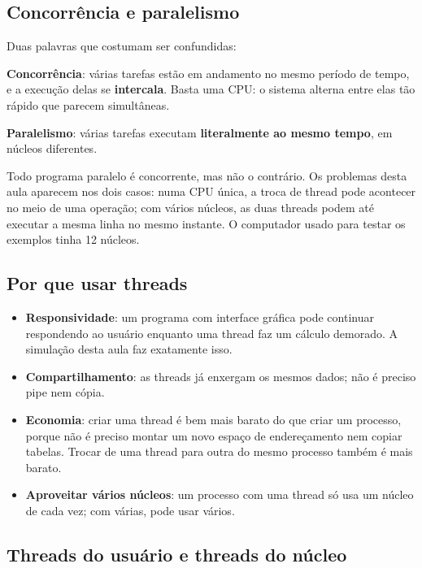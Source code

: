 \documentclass[11pt,a4paper]{article}
\begin{document}
\subsection{Concorrência e paralelismo}

Duas palavras que costumam ser confundidas:

\begin{definicao}
\textbf{Concorrência}: várias tarefas estão em andamento no mesmo período de tempo, e a execução delas se \textbf{intercala}. Basta uma CPU: o sistema alterna entre elas tão rápido que parecem simultâneas.

\textbf{Paralelismo}: várias tarefas executam \textbf{literalmente ao mesmo tempo}, em núcleos diferentes.
\end{definicao}

Todo programa paralelo é concorrente, mas não o contrário. Os problemas desta aula aparecem nos dois casos: numa CPU única, a troca de thread pode acontecer no meio de uma operação; com vários núcleos, as duas threads podem até executar a mesma linha no mesmo instante. O computador usado para testar os exemplos tinha 12 núcleos.

\subsection{Por que usar threads}

\begin{itemize}
    \item \textbf{Responsividade}: um programa com interface gráfica pode continuar respondendo ao usuário enquanto uma thread faz um cálculo demorado. A simulação desta aula faz exatamente isso.
    \item \textbf{Compartilhamento}: as threads já enxergam os mesmos dados; não é preciso pipe nem cópia.
    \item \textbf{Economia}: criar uma thread é bem mais barato do que criar um processo, porque não é preciso montar um novo espaço de endereçamento nem copiar tabelas. Trocar de uma thread para outra do mesmo processo também é mais barato.
    \item \textbf{Aproveitar vários núcleos}: um processo com uma thread só usa um núcleo de cada vez; com várias, pode usar vários.
\end{itemize}

\subsection{Threads do usuário e threads do núcleo}
\end{document}
